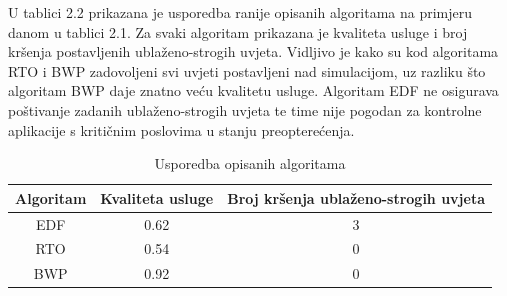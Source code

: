 \documentclass[../zavrsni.tex]{subfiles}
\begin{document}
U tablici 2.2 prikazana je usporedba ranije opisanih algoritama na primjeru danom u tablici 2.1. Za svaki algoritam prikazana je 
kvaliteta usluge i broj kršenja postavljenih ublaženo-strogih uvjeta. 
Vidljivo je kako su kod algoritama RTO i BWP zadovoljeni svi uvjeti postavljeni nad simulacijom, uz razliku što algoritam BWP daje 
znatno veću kvalitetu usluge. Algoritam EDF ne osigurava poštivanje zadanih ublaženo-strogih uvjeta te time nije pogodan za kontrolne 
aplikacije s kritičnim poslovima u stanju preopterećenja.

\begin{table}[h!]
  \begin{center}
    \begin{tabular}{||c || c | c ||} 
     \hline
     Algoritam & Kvaliteta usluge & Broj kršenja ublaženo-strogih uvjeta \\ [0.5ex] 
     \hline\hline
     EDF & 0.62 & 3 \\ 
     \hline
     RTO & 0.54 & 0 \\
     \hline
     BWP & 0.92 & 0 \\
     \hline
    \end{tabular}
  \end{center}
  \caption{\label{tab:table-name}Usporedba opisanih algoritama}
  \end{table}
\end{document}
